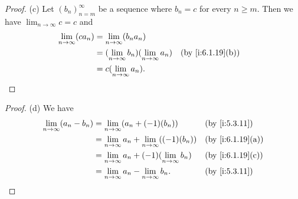 \begin{proof}{(c)}
  Let \((b_n)_{n = m}^\infty\) be a sequence where \(b_n = c \) for every \(n \geq m\).
  Then we have \(\lim_{n \to \infty} c = c\) and
  \begin{align*}
    \lim_{n \to \infty} (c a_n) & = \lim_{n \to \infty} (b_n a_n)                                            \\
                                & = (\lim_{n \to \infty} b_n)(\lim_{n \to \infty} a_n) &  & \by{i:6.1.19}[b] \\
                                & = c(\lim_{n \to \infty} a_n).
  \end{align*}
\end{proof}

\begin{proof}{(d)}
  We have
  \begin{align*}
    \lim_{n \to \infty} (a_n - b_n) & = \lim_{n \to \infty} (a_n + (-1)(b_n))                     &  & \by{i:5.3.11}    \\
                                    & = \lim_{n \to \infty} a_n + \lim_{n \to \infty} ((-1)(b_n)) &  & \by{i:6.1.19}[a] \\
                                    & = \lim_{n \to \infty} a_n + (-1)(\lim_{n \to \infty} b_n)   &  & \by{i:6.1.19}[c] \\
                                    & = \lim_{n \to \infty} a_n - \lim_{n \to \infty} b_n.        &  & \by{i:5.3.11}
  \end{align*}
\end{proof}

